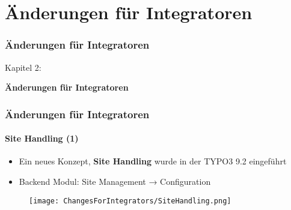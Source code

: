 %

\section{Änderungen für Integratoren}
\begin{frame}[fragile]
	\frametitle{Änderungen für Integratoren}

	\begin{center}\huge{Kapitel 2:}\end{center}
	\begin{center}\huge{\color{typo3darkgrey}\textbf{Änderungen für Integratoren}}\end{center}

\end{frame}


\begin{frame}[fragile]
	\frametitle{Änderungen für Integratoren}
	\framesubtitle{Site Handling (1)}

	\begin{itemize}
		\item Ein neues Konzept, \textbf{Site Handling} wurde in der TYPO3 9.2 eingeführt 
		\item Backend Modul: Site Management → Configuration

	\end{itemize}

	\begin{figure}
		\texttt{[image: ChangesForIntegrators/SiteHandling.png]}
	\end{figure}

\end{frame}

